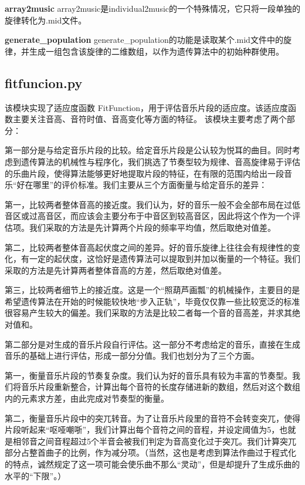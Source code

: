 \documentclass{article}
\begin{document}
\textbf{array2music}
\quad array2music是individual2music的一个特殊情况，它只将一段单独的旋律转化为.mid文件。

\textbf{generate\_population}
\quad generate\_population的功能是读取某个.mid文件中的旋律，并生成一组包含该旋律的二维数组，以作为遗传算法中的初始种群使用。

\subsection{fitfuncion.py}

该模块实现了适应度函数 FitFunction，用于评估音乐片段的适应度。该适应度函数主要关注音高、音符时值、音高变化等方面的特征。
该模块主要考虑了两个部分：

第一部分是与给定音乐片段的比较。给定音乐片段是公认较为悦耳的曲目。同时考虑到遗传算法的机械性与程序化，我们挑选了节奏型较为规律、音高旋律易于评估的乐曲片段，使得算法能够更好地提取片段的特征，在有限的范围内给出一段音乐“好在哪里”的评价标准。我们主要从三个方面衡量与给定音乐的差异：

第一，比较两者整体音高的接近度。我们认为，好的音乐一般不会全部布局在过低音区或过高音区，而应该会主要分布于中音区到较高音区，因此将这个作为一个评估项。我们采取的方法是先计算两个片段的频率平均值，然后取绝对值差。

第二，比较两者整体音高起伏度之间的差异。好的音乐旋律上往往会有规律性的变化，有一定的起伏度，这恰好是遗传算法可以提取到并加以衡量的一个特征。我们采取的方法是先计算两者整体音高的方差，然后取绝对值差。

第三，比较两者细节上的接近度。这是一个“照葫芦画瓢”的机械操作，主要目的是希望遗传算法在开始的时候能较快地“步入正轨”，毕竟仅仅靠一些比较宽泛的标准很容易产生较大的偏差。我们采取的方法是比较二者每一个音的音高差，并求其绝对值和。

第二部分是对生成的音乐片段自行评估。这一部分不考虑给定的音乐，直接在生成音乐的基础上进行评估，形成一部分分值。我们也划分为了三个方面。

第一，衡量音乐片段的节奏复杂度。我们认为好的音乐具有较为丰富的节奏型。我们将音乐片段重新整合，计算出每个音符的长度存储进新的数组，然后对这个数组内的元素求方差，由此完成对节奏型的衡量。

第二，衡量音乐片段中的突兀转音。为了让音乐片段里的音符不会转变突兀，使得片段听起来“呕哑嘲哳”，我们计算出每个音符之间的音程，并设定阈值为5，也就是相邻音之间音程超过5个半音会被我们判定为音高变化过于突兀。我们计算突兀部分占整首曲子的比例，作为减分项。（当然，这也是考虑到算法作曲过于程式化的特点，诚然规定了这一项可能会使乐曲不那么“灵动”，但是却提升了生成乐曲的水平的“下限”。）
\end{document}

